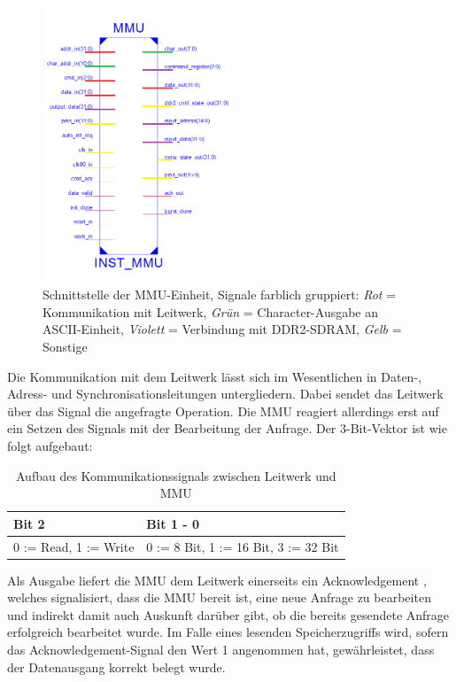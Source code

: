 \begin{figure}[H]
	\label{fig:mmuinterface}
	\centering
		\includegraphics[width=0.5\textwidth]{interface.png}
	\caption[Schnittstelle der MMU-Einheit]{Schnittstelle der MMU-Einheit, Signale farblich gruppiert: \textit{Rot} = Kommunikation mit Leitwerk, \textit{Gr\"un} = Character-Ausgabe an ASCII-Einheit, \textit{Violett} = Verbindung mit DDR2-SDRAM, \textit{Gelb} = Sonstige}
\end{figure}


Die Kommunikation mit dem Leitwerk l\"asst sich im Wesentlichen in Daten-, Adress- und Synchronisationsleitungen untergliedern. Dabei sendet das Leitwerk \"uber das Signal  die angefragte Operation. Die MMU reagiert allerdings erst auf ein Setzen des  Signals mit der Bearbeitung der Anfrage. Der 3-Bit-Vektor  ist wie folgt aufgebaut:

\begin{table}[H]
	\begin{center}
	\begin{tabular}{| l | l |}
		\hline
		Bit 2 & Bit 1 - 0 \\ \hline
		0 := Read, 1 := Write & 0 := 8 Bit, 1 := 16 Bit, 3 := 32 Bit \\ 		\hline
	\end{tabular}
	\caption{Aufbau des Kommunikationssignals zwischen Leitwerk und MMU}
\end{center}
\end{table}

Als Ausgabe liefert die MMU dem Leitwerk einerseits ein Acknowledgement , welches signalisiert, dass die MMU bereit ist, eine neue Anfrage zu bearbeiten und indirekt damit auch Auskunft dar\"uber gibt, ob die bereits gesendete Anfrage erfolgreich bearbeitet wurde. Im Falle eines lesenden Speicherzugriffs wird, sofern das Acknowledgement-Signal den Wert 1 angenommen hat, gew\"ahrleistet, dass der Datenausgang  korrekt belegt wurde.

